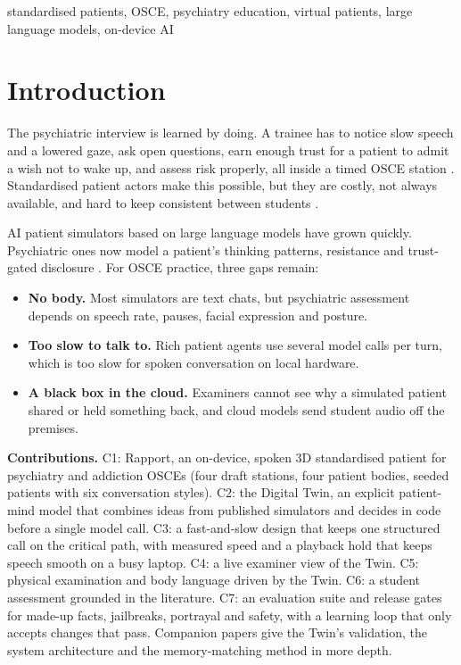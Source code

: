 \documentclass[journal]{IEEEtran}
\begin{document}
\begin{IEEEkeywords}
standardised patients, OSCE, psychiatry education, virtual patients, large language models, on-device AI
\end{IEEEkeywords}

\section{Introduction}
The psychiatric interview is learned by doing. A trainee has to notice slow speech and a lowered gaze, ask open questions, earn enough trust for a
patient to admit a wish not to wake up, and assess risk properly, all inside a timed OSCE station \cite{harden1975osce}. Standardised patient actors
make this possible, but they are costly, not always available, and hard to keep consistent between students \cite{piot2021simulation}.

AI patient simulators based on large language models have grown quickly. Psychiatric ones now model a patient's thinking patterns, resistance and
trust-gated disclosure \cite{wang2024patient,lee2025psyche,sabour2026patientact}. For OSCE practice, three gaps remain:
\begin{itemize}
\item \textbf{No body.} Most simulators are text chats, but psychiatric assessment depends on speech rate, pauses, facial expression and posture.
\item \textbf{Too slow to talk to.} Rich patient agents use several model calls per turn, which is too slow for spoken conversation on local hardware.
\item \textbf{A black box in the cloud.} Examiners cannot see why a simulated patient shared or held something back, and cloud models send student
audio off the premises.
\end{itemize}

\textbf{Contributions.}
C1: Rapport, an on-device, spoken 3D standardised patient for psychiatry and addiction OSCEs (four draft stations, four patient bodies, seeded patients
with six conversation styles).
C2: the Digital Twin, an explicit patient-mind model that combines ideas from published simulators and decides in code before a single model call.
C3: a fast-and-slow design that keeps one structured call on the critical path, with measured speed and a playback hold that keeps speech smooth
on a busy laptop.
C4: a live examiner view of the Twin.
C5: physical examination and body language driven by the Twin.
C6: a student assessment grounded in the literature.
C7: an evaluation suite and release gates for made-up facts, jailbreaks, portrayal and safety, with a learning loop that only accepts changes that pass.
Companion papers give the Twin's validation, the system architecture and the memory-matching method in more depth.
\end{document}
